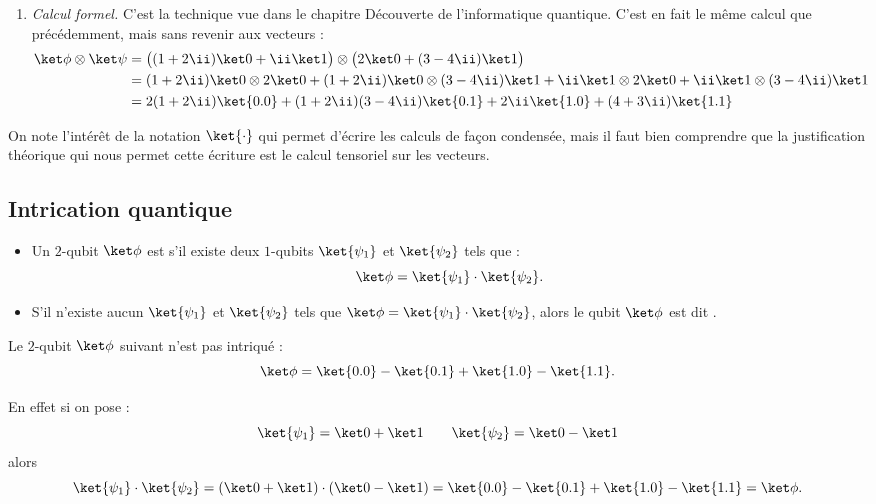 \documentclass[11pt,class=report,crop=false]{standalone}
\begin{document}
\begin{exemple}
\begin{enumerate}
    
  \item \emph{Calcul formel.} C'est la technique vue dans le chapitre \og{}Découverte de l'informatique quantique\fg{}. C'est en fait le même calcul que précédemment, mais sans revenir aux vecteurs :
\begin{align*}
\ket \phi \otimes \ket \psi
  &= \big((1+2\ii)\ket0 + \ii\ket1\big) \otimes \big(2\ket0 + (3-4\ii)\ket1\big)  \\
  &=  (1+2\ii)\ket0 \otimes 2\ket0 
  + (1+2\ii)\ket0 \otimes (3-4\ii)\ket1
  + \ii\ket1 \otimes 2\ket0 
  + \ii\ket1 \otimes   (3-4\ii)\ket1 \\
  &= 2(1+2\ii) \ket{0.0} + (1+2\ii)(3-4\ii)\ket{0.1} + 2\ii\ket{1.0}+ (4+3\ii)\ket{1.1} \\
\end{align*}
\end{enumerate}    

On note l'intérêt de la notation $\ket{\cdot}$ qui permet d'écrire les calculs de façon condensée, mais il faut bien comprendre que la justification théorique qui nous permet cette écriture est le calcul tensoriel sur les vecteurs.
  
\end{exemple}

\subsection{Intrication quantique}


\begin{definition}
\sauteligne
\begin{itemize}
  \item Un $2$-qubit $\ket\phi$ est  s'il existe deux $1$-qubits $\ket{\psi_1}$ et $\ket{\psi_2}$ tels que :
$$\ket\phi = \ket{\psi_1} \cdot \ket{\psi_2}.$$
  \item S'il n'existe aucun $\ket{\psi_1}$
et $\ket{\psi_2}$ tels que $\ket\phi = \ket{\psi_1} \cdot \ket{\psi_2}$, alors
le qubit $\ket\phi$ est dit .
\end{itemize}
\end{definition}

\begin{exemple}
Le $2$-qubit $\ket\phi$ suivant n'est pas intriqué :
$$\ket\phi = \ket{0.0} - \ket{0.1} + \ket{1.0} - \ket{1.1}.$$

En effet si on pose :
$$\ket{\psi_1} = \ket0+\ket1 \qquad \ket{\psi_2} = \ket0-\ket1$$
alors
$$\ket{\psi_1}\cdot \ket{\psi_2} = (\ket0+\ket1) \cdot (\ket0-\ket1)
= \ket{0.0} - \ket{0.1} + \ket{1.0} - \ket{1.1} = \ket\phi.$$
\end{exemple}
\end{document}

